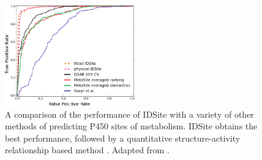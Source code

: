 \begin{figure}[h!]
\centering
\includegraphics[width=0.5\textwidth]{figures/idsite/roc_other_methods.png}
\caption{A comparison of the performance of IDSite with a variety of other methods of predicting P450 sites of metabolism.
IDSite obtains the best performance, followed by a quantitative structure-activity relationship based method \protect\cite{sheridan2007empirical}.
Adapted from \protect\cite{sheridan2007empirical}.}
\label{figure:idsite_other}
\end{figure}
